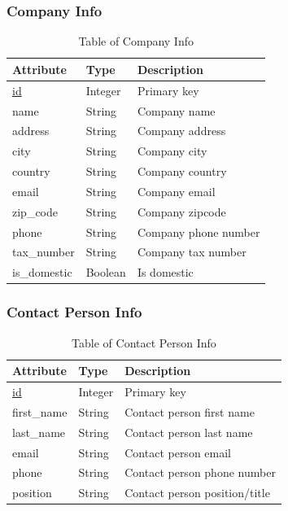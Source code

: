 \subsubsection{Company Info}
\begin{table}[H]
    \centering
    \begin{tabular}{|p{3cm}|p{2cm}|p{\dimexpr\textwidth-6.8cm}|} %
        \hline
        \rowcolor[HTML]{C0C0C0} 
        \textbf{Attribute} & \textbf{Type} & \textbf{Description} \\ \hline
        \underline{id} & Integer & Primary key \\ \hline
        name & String & Company name \\ \hline
        address & String & Company address \\ \hline
        city & String & Company city \\ \hline
        country & String & Company country \\ \hline
        email & String & Company email \\ \hline
        zip\_code & String & Company zip\-code \\ \hline
        phone & String & Company phone number \\ \hline
        tax\_number & String & Company tax number \\ \hline
        is\_domestic & Boolean & Is domestic \\ \hline
    \end{tabular}
    \caption{Table of Company Info}
    \label{tab:company-info-table}
\end{table}

\subsubsection{Contact Person Info}
\begin{table}[H]
    \centering
    \begin{tabular}{|p{3cm}|p{2cm}|p{\dimexpr\textwidth-6.8cm}|} %
        \hline
        \rowcolor[HTML]{C0C0C0} 
        \textbf{Attribute} & \textbf{Type} & \textbf{Description} \\ \hline
        \underline{id} & Integer & Primary key \\ \hline
        first\_name & String & Contact person first name \\ \hline
        last\_name & String & Contact person last name \\ \hline
        email & String & Contact person email \\ \hline
        phone & String & Contact person phone number \\ \hline
        position & String & Contact person position/title \\ \hline
    \end{tabular}
    \caption{Table of Contact Person Info}
    \label{tab:contact-person-info-table}
\end{table}

